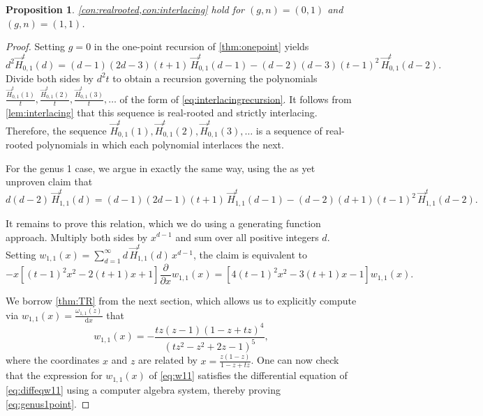 \documentclass[a4paper]{article}
\theoremstyle{plain}
\newtheorem{proposition}[theorem]{Proposition}
\numberwithin{theorem}{section}
\theoremstyle{definition}
\theoremstyle{remark}
\newcommand{\dd}{\mathrm{d}}
\newcommand{\HN}[3]{\vec{H}^t_{#1,#2}(#3)}
\begin{document}
\begin{proposition} \label{prop:genus01}
\cref{con:realrooted,con:interlacing} hold for $(g,n) = (0,1)$ and $(g,n) = (1,1)$.
\end{proposition}


\begin{proof}
Setting $g = 0$ in the one-point recursion of \cref{thm:onepoint} yields
\begin{equation} \label{eq:genus0point}
d^2 \HN{0}{1}{d} = (d-1) (2d-3) (t+1) \, \HN{0}{1}{d-1} - (d-2) (d-3) (t-1)^2 \, \HN{0}{1}{d-2}.
\end{equation}
Divide both sides by $d^2t$ to obtain a recursion governing the polynomials $\frac{\HN{0}{1}{1}}{t}, \frac{\HN{0}{1}{2}}{t}, \frac{\HN{0}{1}{3}}{t}, \ldots$ of the form of \cref{eq:interlacingrecursion}. It follows from \cref{lem:interlacing} that this sequence is real-rooted and strictly interlacing. Therefore, the sequence $\HN{0}{1}{1}, \HN{0}{1}{2}, \HN{0}{1}{3}, \ldots$ is a sequence of real-rooted polynomials in which each polynomial interlaces the next.


For the genus 1 case, we argue in exactly the same way, using the as yet unproven claim that
\begin{equation} \label{eq:genus1point}
d(d-2) \, \HN{1}{1}{d} = (d-1) (2d-1) (t+1) \, \HN{1}{1}{d-1} - (d-2) (d+1) (t-1)^2 \, \HN{1}{1}{d-2}.
\end{equation}


It remains to prove this relation, which we do using a generating function approach. Multiply both sides by $x^{d-1}$ and sum over all positive integers $d$. Setting $w_{1,1}(x) = \sum_{d=1}^\infty d \, \HN{1}{1}{d} \, x^{d-1}$, the claim is equivalent to
\begin{equation} \label{eq:diffeqw11}
-x \left[ (t-1)^2 x^2 - 2(t+1) x + 1 \right] \frac{\partial}{\partial x} w_{1,1}(x) = \left[ 4(t-1)^2 x^2 - 3(t+1) x - 1 \right] w_{1,1}(x).
\end{equation}


We borrow \cref{thm:TR} from the next section, which allows us to explicitly compute via $w_{1,1}(x) = \frac{\omega_{1,1}(z)}{\dd x}$ that
\begin{equation} \label{eq:w11}
w_{1,1}(x) = -\frac{t z (z-1) (1 - z + tz)^4}{(tz^2 - z^2 + 2z - 1)^5},
\end{equation}
where the coordinates $x$ and $z$ are related by $x = \frac{z(1 - z)}{1-z+tz}$. One can now check that the expression for $w_{1,1}(x)$ of \cref{eq:w11} satisfies the differential equation of \cref{eq:diffeqw11} using a computer algebra system, thereby proving \cref{eq:genus1point}.
\end{proof}
\end{document}
